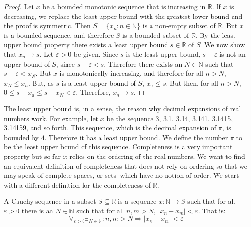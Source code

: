             \begin{proof}
                Let $x$ be a bounded monotonic sequence that
                is increasing in $\mathbb{R}$.
                If $x$ is decreasing, we replace the least
                upper bound with the greatest lower
                bound and the proof is symmetric.
                Then $S=\{x_{n}:n\in\mathbb{N}\}$ is a
                non-empty subset of $\mathbb{R}$. But $x$ is
                a bounded sequence, and therefore $S$ is a
                bounded subset of $\mathbb{R}$. By the least
                upper bound property there exists a least
                upper bound $s\in\mathbb{R}$ of $S$.
                We now show that $x_{n}\rightarrow{s}$.
                Let $\varepsilon>0$ be given. Since $s$ is
                the least upper bound, $s-\varepsilon$
                is not an upper bound of $S$, since
                $s-\varepsilon<s$. Therefore there exists
                an $N\in\mathbb{N}$ such that
                $s-\varepsilon<x_{N}$. But $x$ is
                monotonically increasing, and therefore
                for all $n>N$, $x_{N}\leq{x_{n}}$.
                But, as $s$ is a least upper
                bound of $S$, $x_{n}\leq{s}$. But then,
                for all $n>N$,
                $0\leq{s-x_{n}}\leq{s-x_{N}}<\varepsilon$.
                Therefore, $x_{n}\rightarrow{s}$.
            \end{proof}
            The least upper bound is, in a sense, the
            reason why decimal expansions of
            real numbers work. For example, let $x$ be the
            sequence 3, 3.1, 3.14, 3.141, 3.1415, 3.14159,
            and so forth. This sequence, which is
            the decimal expansion of $\pi$, is bounded by $4$.
            Therefore it has a least upper bound.
            We define the number $\pi$
            to be the least upper bound of this sequence.
            Completeness is a very important property
            but so far it relies on the ordering
            of the real numbers.
            We want to find an equivalent definition
            of completeness that does not rely on ordering
            so that we may speak of complete spaces,
            or sets, which have no notion of
            order. We start with a different definition
            for the completeness of $\mathbb{R}$.
            \begin{definition}
                A Cauchy sequence in a subset
                $S\subseteq\mathbb{R}$ is a
                sequence $x:\mathbb{N}\rightarrow{S}$
                such that for all $\varepsilon>0$ there
                is an $N\in\mathbb{N}$ such that for all
                $n,m>N$, $|x_{n}-x_{m}|<\varepsilon$.
                That is:
                \begin{equation}
                    \label{thm:Func_Def_Cauchy_Sequence}
                    \forall_{\varepsilon>0}
                    \exists_{N\in\mathbb{N}}:
                    n,m>N\Rightarrow
                    |x_{n}-x_{m}|<\varepsilon
                \end{equation}
            \end{definition}
